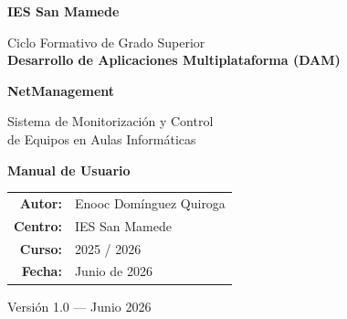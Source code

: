 \documentclass[12pt,a4paper]{article}
\begin{document}
\begin{titlepage}
  \thispagestyle{empty}
  \centering

  \vspace*{1cm}

  {\large\bfseries\color{secondary} IES San Mamede\par}
  \vspace{0.3cm}
  {\normalsize Ciclo Formativo de Grado Superior\\[0.15cm]
  \textbf{Desarrollo de Aplicaciones Multiplataforma (DAM)}\par}

  \vspace{1.5cm}

  {\Huge\bfseries\color{primary} NetManagement\par}
  \vspace{0.6cm}
  {\LARGE Sistema de Monitorización y Control\\de Equipos en Aulas Informáticas\par}

  \vspace{1.5cm}


  \vspace{1.5cm}

  {\Large\bfseries Manual de Usuario\par}

  \vspace{2cm}

  \begin{tabular}{rl}
    \textbf{Autor:}  & Enooc Domínguez Quiroga \\[0.3cm]
    \textbf{Centro:} & IES San Mamede \\[0.3cm]
    \textbf{Curso:}  & 2025 / 2026 \\[0.3cm]
    \textbf{Fecha:}  & Junio de 2026 \\
  \end{tabular}

  \vfill

  {\small Versión 1.0 --- Junio 2026\par}
\end{titlepage}

\newpage
\thispagestyle{empty}
\tableofcontents
\newpage
\end{document}
